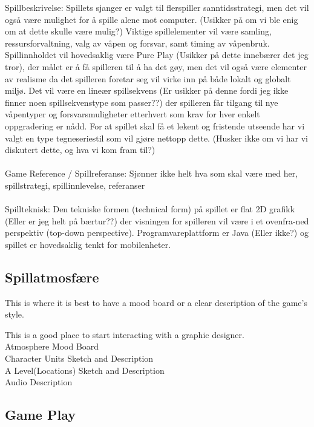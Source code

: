 Spillbeskrivelse: Spillets sjanger er valgt til flerspiller sanntidsstrategi, men det vil også være mulighet for å spille alene mot computer. (Usikker på om vi ble enig om at dette skulle være mulig?) Viktige spillelementer vil være samling, ressursforvaltning, valg av våpen og forsvar, samt timing av våpenbruk. Spillinnholdet vil hovedsaklig være Pure Play (Usikker på dette innebærer det jeg tror), der målet er å få spilleren til å ha det gøy, men det vil også være elementer av realisme da det spilleren foretar seg vil virke inn på både lokalt og globalt miljø. Det vil være en lineær spillsekvens (Er usikker på denne fordi jeg ikke finner noen  spillsekvenstype som passer??) der spilleren får tilgang til nye våpentyper og forsvarsmuligheter etterhvert som krav for hver enkelt oppgradering er nådd. For at spillet skal få et lekent og fristende utseende har vi valgt en type tegneseriestil som vil gjøre nettopp dette. (Husker ikke om vi har vi diskutert dette, og hva vi kom fram til?)\\ 
\\
Game Reference / Spillreferanse: Sjønner ikke helt hva som skal være med her, spillstrategi, spillinnlevelse, referanser\\
\\
Spillteknisk: Den tekniske formen (technical form) på spillet er flat 2D grafikk (Eller er jeg helt på bærtur??) der visningen for spilleren vil være i et ovenfra-ned perspektiv (top-down perspective). Programvareplattform er Java (Eller ikke?) og spillet er hovedsaklig tenkt for mobilenheter.

\subsection{Spillatmosfære}

This is where it is best to have a mood board or a clear description of the game’s style. 

This is a good place to start interacting with a graphic designer.\\

Atmosphere Mood Board\\
Character  Units Sketch and Description\\
A Level(Locations) Sketch and Description\\
Audio Description

\subsection{Game Play}

